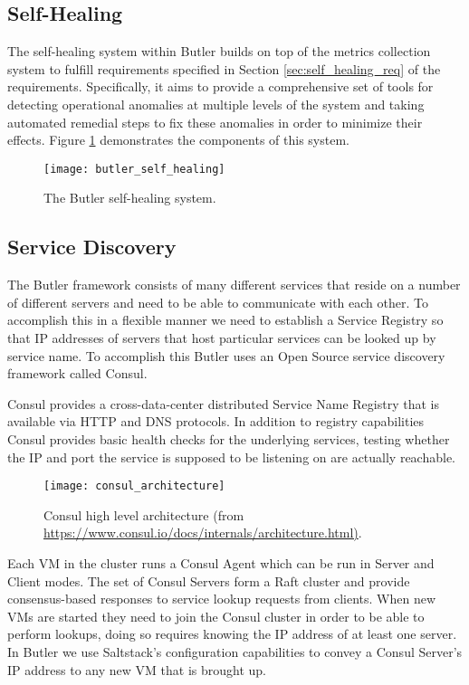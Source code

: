 \subsection{Self-Healing}
\label{sec:self_healing}

The self-healing system within Butler builds on top of the metrics collection system to fulfill requirements specified in Section \ref{sec:self_healing_req} of the requirements. Specifically, it aims to provide a comprehensive set of tools for detecting operational anomalies at multiple levels of the system and taking automated remedial steps to fix these anomalies in order to minimize their effects. Figure \ref{fig:butler_self_healing} demonstrates the components of this system.

\begin{figure}[h]
    \texttt{[image: butler\_self\_healing]}
    \centering
    \caption {The Butler self-healing system.}
    \label{fig:butler_self_healing}
\end{figure}



\subsection{Service Discovery} 
\label{sec:design_consul}

The Butler framework consists of many different services that reside on a number of different servers and need to be able to communicate with each other. To accomplish this in a flexible manner we need to establish a Service Registry so that IP addresses of servers that host particular services can be looked up by service name. To accomplish this Butler uses an Open Source service discovery framework called Consul\autocite{Consul_by_HashiCorp}.

Consul provides a cross-data-center distributed Service Name Registry that is available via HTTP and DNS protocols. In addition to registry capabilities Consul provides basic health checks for the underlying services, testing whether the IP and port the service is supposed to be listening on are actually reachable.

\begin{figure}[h]
\texttt{[image: consul\_architecture]}
\centering
\caption {Consul high level architecture (from \url{https://www.consul.io/docs/internals/architecture.html)}.}
\label{fig:consul_architecture}
\end{figure} 

Each VM in the cluster runs a Consul Agent which can be run in Server and Client modes. The set of Consul Servers form a Raft cluster and provide consensus-based responses to service lookup requests from clients. When new VMs are started they need to join the Consul cluster in order to be able to perform lookups, doing so requires knowing the IP address of at least one server. In Butler we use Saltstack's configuration capabilities to convey a Consul Server's IP address to any new VM that is brought up. 

